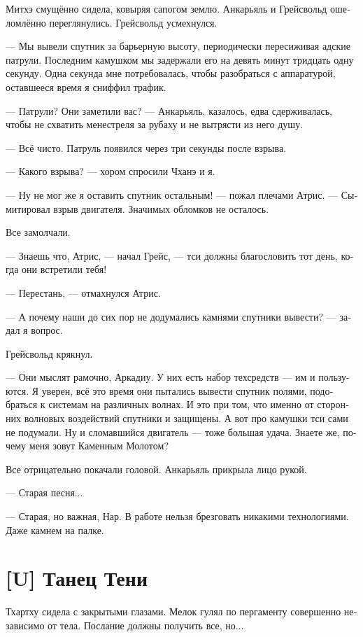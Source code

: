 \documentclass[a4paper,12pt,fleqn]{book}\usepackage{cooltooltips}\usepackage{polyglossia}\setdefaultlanguage[babelshorthands=true]{russian}\setotherlanguage{english}\defaultfontfeatures{Ligatures=TeX,Mapping=tex-text} \usepackage{xcolor}\definecolor{lightgray}{HTML}{bbbbbb}\color{lightgray}\newcommand{\ml}[3]{\textenglish{\textcolor{black}{#3}}}
\newcommand{\textspace}{\vspace{1em}{\centering\Large\bfseries<...>\par}\vspace{1em}}
\begin{document}
Митхэ смущённо сидела, ковыряя сапогом землю.
Анкарьяль и Грейсвольд ошеломлённо переглянулись.
Грейсвольд усмехнулся.

--- Мы вывели спутник за барьерную высоту, периодически пересиживая адские патрули.
Последним камушком мы задержали его на девять минут тридцать одну секунду.
Одна секунда мне потребовалась, чтобы разобраться с аппаратурой, оставшееся время я сниффил трафик.

--- Патрули?
Они заметили вас? --- Анкарьяль, казалось, едва сдерживалась, чтобы не схватить менестреля за рубаху и не вытрясти из него душу.

--- Всё чисто.
Патруль появился через три секунды после взрыва.

--- Какого взрыва? --- хором спросили Чханэ и я.

--- Ну не мог же я оставить спутник остальным! --- пожал плечами Атрис.
--- Сымитировал взрыв двигателя.
Значимых обломков не осталось.

Все замолчали.

--- Знаешь что, Атрис, --- начал Грейс, --- тси должны благословить тот день, когда они встретили тебя!

--- Перестань, --- отмахнулся Атрис.

--- А почему наши до сих пор не додумались камнями спутники вывести? --- задал я вопрос.

Грейсвольд крякнул.

--- Они мыслят рамочно, Аркадиу.
У них есть набор техсредств --- им и пользуются.
Я уверен, всё это время они пытались вывести спутник полями, подобраться к системам на различных волнах.
И это при том, что именно от сторонних волновых воздействий спутники и защищены.
А вот про камушки тси сами не подумали.
Ну и сломавшийся двигатель --- тоже большая удача.
Знаете же, почему меня зовут Каменным Молотом?

Все отрицательно покачали головой.
Анкарьяль прикрыла лицо рукой.

--- Старая песня...

--- Старая, но важная, Нар.
В работе нельзя брезговать никакими технологиями.
Даже камнем на палке.

\section{[U] Танец Тени}

\textspace

Тхартху сидела с закрытыми глазами.
Мелок гулял по пергаменту совершенно независимо от тела.
Послание должны получить все, но...
\end{document}
